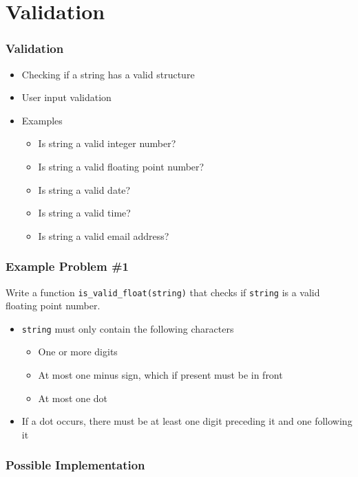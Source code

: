 \section{Validation}

\frame{\tableofcontents[currentsection]}

\begin{frame}
  \frametitle{Validation}
  \begin{itemize}
    \item Checking if a string has a valid structure
    \item User input validation
    \item Examples
      \begin{itemize}
        \item Is string a valid integer number?
        \item Is string a valid floating point number?
        \item Is string a valid date?
        \item Is string a valid time?
        \item Is string a valid email address?
      \end{itemize}
  \end{itemize}
\end{frame}

\begin{frame}
  \frametitle{Example Problem \#1}
  \begin{center}
    Write a function \texttt{is\_valid\_float(string)} that checks if \texttt{string} is a valid floating point number.
  \end{center}
  \vskip5mm
  \begin{itemize}
    \item \texttt{string} must only contain the following characters
      \begin{itemize}
        \item One or more digits
        \item At most one minus sign, which if present must be in front
        \item At most one dot
      \end{itemize}
    \item If a dot occurs, there must be at least one digit preceding it and one following it
  \end{itemize}
\end{frame}

\begin{frame}
  \frametitle{Possible Implementation}
\end{frame}

